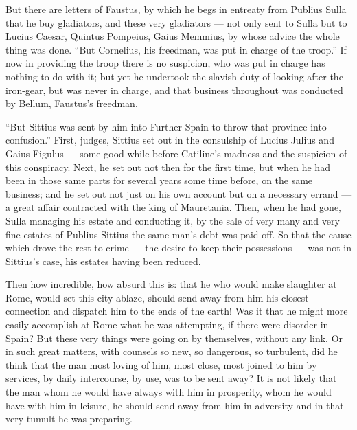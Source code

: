  But there are letters of Faustus, by which he begs in entreaty from Publius Sulla that he buy gladiators, and these very gladiators --- not only sent to Sulla but to Lucius Caesar, Quintus Pompeius, Gaius Memmius, by whose advice the whole thing was done. ``But Cornelius, his freedman, was put in charge of the troop.'' If now in providing the troop there is no suspicion, who was put in charge has nothing to do with it; but yet he undertook the slavish duty of looking after the iron-gear, but was never in charge, and that business throughout was conducted by Bellum, Faustus's freedman.

 ``But Sittius was sent by him into Further Spain to throw that province into confusion.'' First, judges, Sittius set out in the consulship of Lucius Julius and Gaius Figulus --- some good while before Catiline's madness and the suspicion of this conspiracy. Next, he set out not then for the first time, but when he had been in those same parts for several years some time before, on the same business; and he set out not just on his own account but on a necessary errand --- a great affair contracted with the king of Mauretania. Then, when he had gone, Sulla managing his estate and conducting it, by the sale of very many and very fine estates of Publius Sittius the same man's debt was paid off. So that the cause which drove the rest to crime --- the desire to keep their possessions --- was not in Sittius's case, his estates having been reduced.

 Then how incredible, how absurd this is: that he who would make slaughter at Rome, would set this city ablaze, should send away from him his closest connection and dispatch him to the ends of the earth! Was it that he might more easily accomplish at Rome what he was attempting, if there were disorder in Spain? But these very things were going on by themselves, without any link. Or in such great matters, with counsels so new, so dangerous, so turbulent, did he think that the man most loving of him, most close, most joined to him by services, by daily intercourse, by use, was to be sent away? It is not likely that the man whom he would have always with him in prosperity, whom he would have with him in leisure, he should send away from him in adversity and in that very tumult he was preparing.

